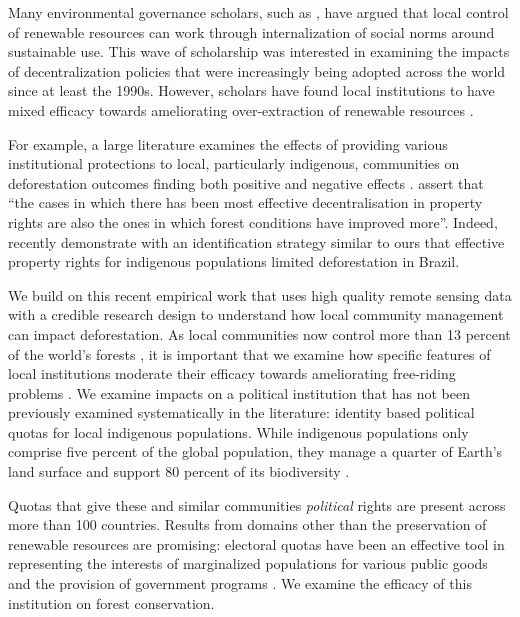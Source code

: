 \documentclass[12pt,reqno]{article}
\begin{document}
Many environmental governance scholars, such as \textcite{dasgupta1995inquiry, Lemos2006-tq, Dietz2003-bs, sethi1996evolution}, have argued that local control of renewable resources can work through internalization of social norms around sustainable use. This wave of scholarship was interested in examining the impacts of decentralization policies that were increasingly being adopted across the world since at least the 1990s.  However, scholars have found local institutions to have mixed efficacy towards ameliorating over-extraction of renewable resources \parencite{feeny1990tragedy}. 

For example, a large literature examines the effects of providing various  institutional protections to local, particularly indigenous, communities on deforestation outcomes finding both positive \parencite{5,6,14,21-16} and negative effects \parencite{14, 27, 28}. \textcite{agrawal2001collective} assert that ``the cases in which there has been most effective decentralisation in property rights are also the ones in which forest conditions have improved more''. Indeed,  \textcite{baragwanath2020collective} recently demonstrate with an identification strategy similar to ours that effective property rights for indigenous populations limited deforestation in Brazil.  

We build on this recent empirical work that uses high quality remote sensing data with a credible research design to understand how local community management can impact deforestation. As local communities now control more than 13 percent of the world's forests \parencite{oldekop2019reductions}, it is important that we examine how specific features of local institutions moderate their efficacy towards ameliorating free-riding problems  \parencite{ostrom1990governing, agrawal1999enchantment, Berkes15188}. We examine impacts on a political institution that has not been previously examined systematically in the literature: identity based political quotas for local indigenous populations. While indigenous populations only comprise five percent of the global population, they manage a quarter of Earth's land surface and support 80 percent of its biodiversity \parencite{garnett2018spatial}.

Quotas that give these and similar communities \emph{political} rights are present across more than 100 countries. Results from domains other than the preservation of renewable resources are promising: electoral quotas have been an effective tool in representing the interests of marginalized populations for various public goods and the provision of government programs \parencite{chattopadhyayWomenPolicyMakers2004,jensenius2017social, gulzar2019}. We examine the efficacy of this institution on forest conservation.
\end{document}

